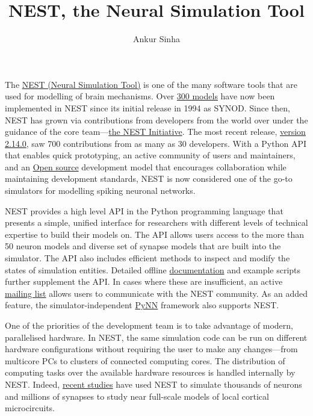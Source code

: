\documentclass[12pt,a4paper]{article}
\title{NEST, the Neural Simulation Tool}
\author{Ankur Sinha}
\begin{document}
\maketitle
The \href{http://www.nest-simulator.org}{NEST (Neural Simulation Tool)} is one of the many software tools that are used for modelling of brain mechanisms.
Over \href{http://www.nest-simulator.org/publications/}{300 models} have now been implemented in NEST since its initial release in 1994 as SYNOD\@.
Since then, NEST has grown via contributions from developers from the world over under the guidance of the core team---\href{http://www.nest-initiative.org/membership/}{the NEST Initiative}.
The most recent release, \href{https://github.com/nest/nest-simulator/releases/tag/v2.14.0 }{version 2.14.0}, saw 700 contributions from as many as 30 developers.
With a Python API that enables quick prototyping, an active community of users and maintainers, and an \href{https://en.wikipedia.org/wiki/Open-source_model}{Open source} development model that encourages collaboration while maintaining development standards, NEST is now considered one of the go-to simulators for modelling spiking neuronal networks.

NEST provides a high level API in the Python programming language that presents a simple, unified interface for researchers with different levels of technical expertise to build their models on. 
The API allows users access to the more than 50 neuron models and diverse set of synapse models that are built into the simulator.
The API also includes efficient methods to inspect and modify the states of simulation entities.
Detailed offline \href{http://www.nest-simulator.org/helpindex/}{documentation} and example scripts further supplement the API\@.
In cases where these are insufficient, an active \href{http://mail.nest-initiative.org/cgi-bin/mailman/listinfo/nest_user }{mailing list} allows users to communicate with the NEST community.
As an added feature, the simulator-independent \href{http://neuralensemble.org/PyNN/}{PyNN} framework also supports NEST\@.

One of the priorities of the development team is to take advantage of modern, parallelised hardware.
In NEST, the same simulation code can be run on different hardware configurations without requiring the user to make any changes---from multicore PCs to clusters of connected computing cores.
The distribution of computing tasks over the available hardware resources is handled internally by NEST\@.
Indeed, \href{https://academic.oup.com/cercor/article/24/3/785/398560}{recent studies} have used NEST to simulate thousands of neurons and millions of synapses to study near full-scale models of local cortical microcircuits.
\end{document}
